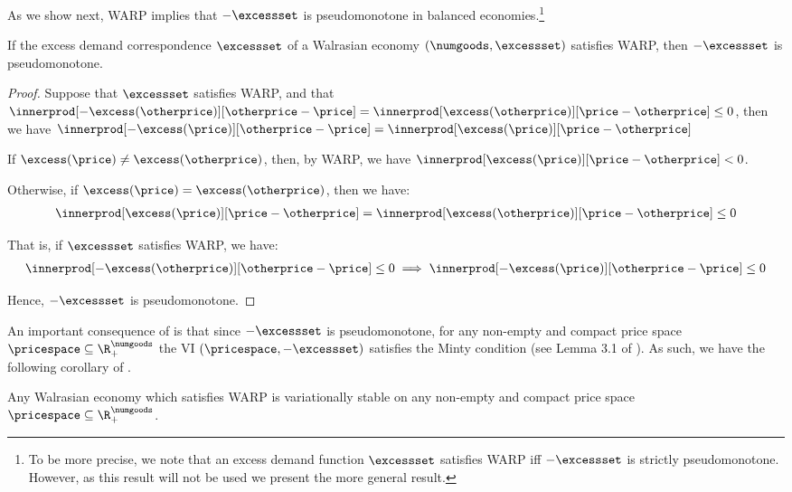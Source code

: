 As we show next, WARP implies that $-\excessset$ is pseudomonotone in balanced economies.\footnote{To be more precise, we note that an excess demand function $\excessset$ satisfies WARP iff $-\excessset$ is strictly pseudomonotone. However, as this result will not be used we present the more general result.} 

\begin{lemma}\label{lemma:warp_implies_pseudomonotone}
    If the excess demand correspondence $\excessset$ of a Walrasian economy $(\numgoods, \excessset)$ satisfies WARP, then $-\excessset$ is pseudomonotone.
\end{lemma}
\begin{proof}
    Suppose that $\excessset$ satisfies WARP, and that $\innerprod[{-\excess(\otherprice)}][{\otherprice - \price}] = \innerprod[{\excess(\otherprice)}][{\price - \otherprice}] \leq 0$, then we have $\innerprod[{-\excess(\price)}][{\otherprice - \price}] = \innerprod[{\excess(\price)}][{\price - \otherprice}]$

    If $\excess(\price) \neq \excess(\otherprice)$, then, by WARP, we have $\innerprod[{\excess(\price)}][{\price - \otherprice}] < 0$. 
    
    Otherwise, if $\excess(\price) = \excess(\otherprice)$, then we have:
    \begin{align*}
        \innerprod[{\excess(\price)}][{\price - \otherprice}] =  \innerprod[{\excess(\otherprice)}][{\price - \otherprice}] \leq 0
    \end{align*}

    That is, if $\excessset$ satisfies WARP, we have:
    \begin{align*}
        \innerprod[{-\excess(\otherprice)}][{\otherprice - \price}] \leq 0 \implies \innerprod[{-\excess(\price)}][{\otherprice - \price}] \leq 0
    \end{align*}
    
    Hence, $-\excessset$ is pseudomonotone.
\end{proof}

An important consequence of  is that since $-\excessset$ is pseudomonotone, for any non-empty and compact price space $\pricespace \subseteq \R^\numgoods_+$ the VI $(\pricespace, -\excessset)$ satisfies the Minty condition (see Lemma 3.1 of \citet{he2017solvability}). As such, we have the following corollary of . 

\begin{corollary}\label{cor:warp_iff_minty}
    Any Walrasian economy which satisfies WARP is variationally stable on any non-empty and compact price space $\pricespace \subseteq \R^\numgoods_+$. 
\end{corollary}
